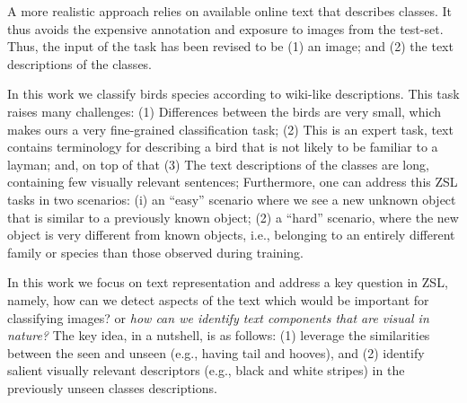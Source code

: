 \documentclass[11pt,a4paper]{article}
\newcommand\gal[1]{\textcolor{bright}{\textbf{GAL:} #1 }}
\begin{document}



A more realistic approach \cite{elhoseiny2017link}%
relies on available online text that describes classes. It thus avoids the expensive annotation and exposure to images from the test-set.
Thus, the input of the task has been revised to be (1) an image; and (2) the text descriptions of the classes. %


In this work we classify birds species according to wiki-like descriptions.
This task raises many challenges: 
(1) Differences between the birds are very small, which makes ours a very fine-grained classification task; (2) This is an expert task, %
text contains terminology for describing a bird that is not likely to be familiar to a layman; and, on top of that 
(3) The text descriptions of the classes are long, containing few visually relevant sentences; 
Furthermore, one can  address this ZSL tasks in two scenarios: %
(i) an \enquote{easy} scenario where we see a new unknown object that is similar to a previously known object; (2) a \enquote{hard} scenario, where the new object is very different from known objects, i.e., belonging to an entirely different family or species than those observed during training.


In this work we focus on text representation and address a key question in ZSL, namely, how can we detect aspects of the text which would be important for classifying images? or \textit {how can we identify text components that are visual in nature?}
The key idea, in a nutshell, is as follows: (1) leverage the similarities between the seen and unseen (e.g., having tail and hooves), and (2) identify salient visually relevant descriptors (e.g., black and white stripes) in the previously unseen classes descriptions.  %
\end{document}
